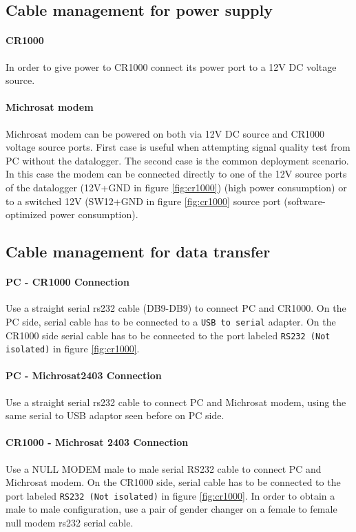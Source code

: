 \subsection{Cable management for power supply}
\paragraph{CR1000}
In order to give power to CR1000 connect its power port to a 12V DC voltage source.
\paragraph{Michrosat modem}
Michrosat modem can be powered on both via 12V DC source and CR1000 voltage source ports. First case is useful when attempting signal quality test from PC without the datalogger.
The second case is the common deployment scenario. In this case the modem can be connected directly to one of the 12V source ports of the datalogger (12V+GND in figure \ref{fig:cr1000}) (high power consumption) or to a switched 12V (SW12+GND in figure \ref{fig:cr1000} source port (software-optimized power consumption).
\subsection{Cable management for data transfer}
\label{subsec:datacable}
\paragraph{PC - CR1000 Connection}
Use a straight serial rs232 cable (DB9-DB9) to connect PC and CR1000. On the PC side, serial cable has to be connected to a {\tt USB to serial} adapter. On the CR1000 side serial cable has to be connected to the port labeled {\tt RS232 (Not isolated)} in figure \ref{fig:cr1000}.
\paragraph{PC - Michrosat2403 Connection}
Use a straight serial rs232 cable to connect PC and Michrosat modem, using the same serial to USB adaptor seen before on PC side.
\paragraph{CR1000 - Michrosat 2403 Connection}
Use a NULL MODEM male to male serial RS232 cable to connect PC and Michrosat modem. On the CR1000 side, serial cable has to be connected to the port labeled {\tt RS232 (Not isolated)} in figure \ref{fig:cr1000}. In order to obtain a male to male configuration, use a pair of gender changer on a female to female null modem rs232 serial cable.